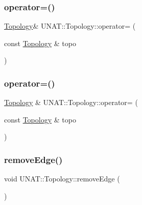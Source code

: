 \mbox{\label{classUNAT_1_1Topology_a75f1187f0c29f844efb53a30e5ddf737}} 
\subsubsection{\texorpdfstring{operator=()}{operator=()}\hspace{0.1cm}{\footnotesize\ttfamily [2/3]}}
{\footnotesize\ttfamily \mbox{\hyperlink{classUNAT_1_1Topology}{Topology}}\& U\+N\+A\+T\+::\+Topology\+::operator= (\begin{DoxyParamCaption}\item[{const \mbox{\hyperlink{classUNAT_1_1Topology}{Topology}} \&}]{topo }\end{DoxyParamCaption})}

\mbox{\label{classUNAT_1_1Topology_a3ffa6caa5e5543f555e6d1bc92e7992d}} 
\subsubsection{\texorpdfstring{operator=()}{operator=()}\hspace{0.1cm}{\footnotesize\ttfamily [3/3]}}
{\footnotesize\ttfamily \mbox{\hyperlink{classUNAT_1_1Topology}{Topology}} \& U\+N\+A\+T\+::\+Topology\+::operator= (\begin{DoxyParamCaption}\item[{const \mbox{\hyperlink{classUNAT_1_1Topology}{Topology}} \&}]{topo }\end{DoxyParamCaption})}

\mbox{\label{classUNAT_1_1Topology_a359fdcc98879b6de79d9a9ea8221bc68}} 
\subsubsection{\texorpdfstring{removeEdge()}{removeEdge()}\hspace{0.1cm}{\footnotesize\ttfamily [1/3]}}
{\footnotesize\ttfamily void U\+N\+A\+T\+::\+Topology\+::remove\+Edge (\begin{DoxyParamCaption}{ }\end{DoxyParamCaption})}

